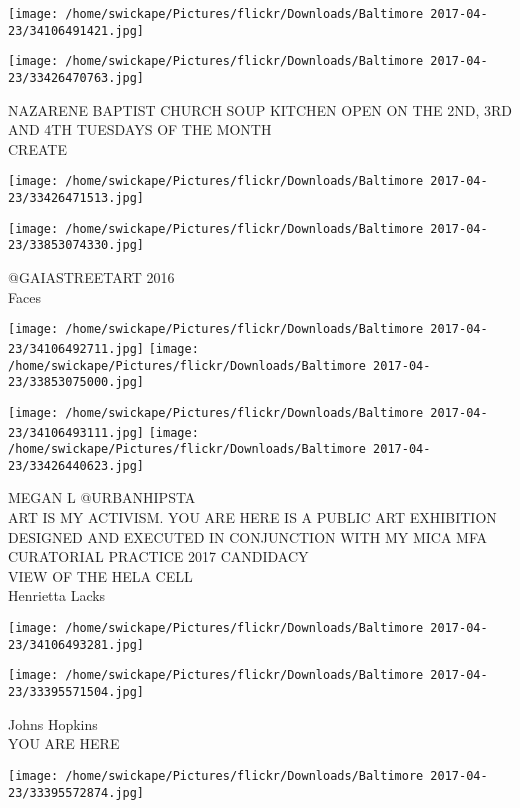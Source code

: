 \documentclass[10pt,letterpaper]{article}
\begin{document}
\texttt{[image: /home/swickape/Pictures/flickr/Downloads/Baltimore 2017-04-23/34106491421.jpg]}

\vspace{0.25in}
\texttt{[image: /home/swickape/Pictures/flickr/Downloads/Baltimore 2017-04-23/33426470763.jpg]}

NAZARENE BAPTIST CHURCH SOUP KITCHEN OPEN ON THE 2ND, 3RD AND 4TH TUESDAYS OF THE MONTH\\
CREATE
\pagebreak

\texttt{[image: /home/swickape/Pictures/flickr/Downloads/Baltimore 2017-04-23/33426471513.jpg]}

\vspace{0.25in}
\texttt{[image: /home/swickape/Pictures/flickr/Downloads/Baltimore 2017-04-23/33853074330.jpg]}

@GAIASTREETART 2016\\
Faces
\pagebreak

\texttt{[image: /home/swickape/Pictures/flickr/Downloads/Baltimore 2017-04-23/34106492711.jpg]}
\texttt{[image: /home/swickape/Pictures/flickr/Downloads/Baltimore 2017-04-23/33853075000.jpg]}

\texttt{[image: /home/swickape/Pictures/flickr/Downloads/Baltimore 2017-04-23/34106493111.jpg]}
\texttt{[image: /home/swickape/Pictures/flickr/Downloads/Baltimore 2017-04-23/33426440623.jpg]}

MEGAN L @URBANHIPSTA\\
ART IS MY ACTIVISM.  YOU ARE HERE IS A PUBLIC ART EXHIBITION DESIGNED AND EXECUTED IN CONJUNCTION WITH MY MICA MFA CURATORIAL PRACTICE 2017 CANDIDACY\\
VIEW OF THE HELA CELL\\
Henrietta Lacks
\pagebreak

\texttt{[image: /home/swickape/Pictures/flickr/Downloads/Baltimore 2017-04-23/34106493281.jpg]}

\vspace{0.25in}
\texttt{[image: /home/swickape/Pictures/flickr/Downloads/Baltimore 2017-04-23/33395571504.jpg]}

Johns Hopkins\\
YOU ARE HERE
\pagebreak

\texttt{[image: /home/swickape/Pictures/flickr/Downloads/Baltimore 2017-04-23/33395572874.jpg]}
\end{document}
